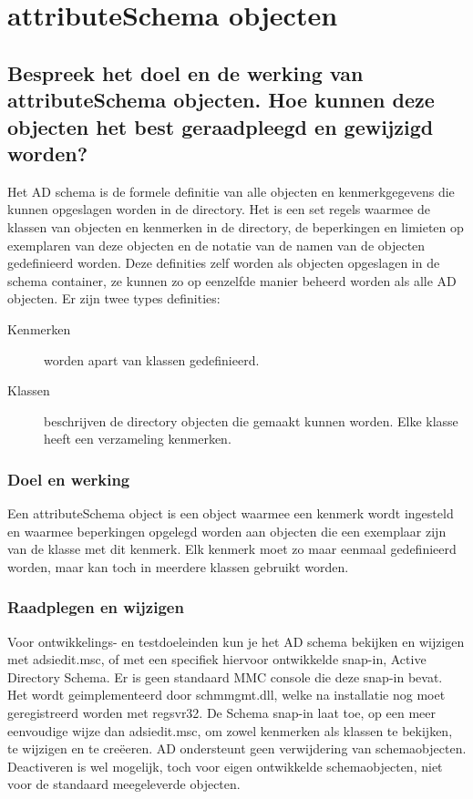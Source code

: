 \chapter{attributeSchema objecten}

\section{Bespreek het doel en de werking van attributeSchema objecten. Hoe
kunnen deze objecten het best geraadpleegd en gewijzigd worden?}

Het AD schema is de formele definitie van alle objecten en kenmerkgegevens die
kunnen opgeslagen worden in de directory. Het is een set regels waarmee de
klassen van objecten en kenmerken in de directory, de beperkingen en limieten op
exemplaren van deze objecten en de notatie van de namen van de objecten
gedefinieerd worden. Deze definities zelf worden als objecten opgeslagen in de
schema container, ze kunnen zo op eenzelfde manier beheerd worden als alle AD
objecten. Er zijn twee types definities:
\begin{description}
	\item[Kenmerken] worden apart van klassen gedefinieerd.
	\item[Klassen] beschrijven de directory objecten die gemaakt kunnen
		worden. Elke klasse heeft een verzameling kenmerken.
\end{description}

\subsection{Doel en werking}

Een attributeSchema object is een object waarmee een kenmerk wordt ingesteld en
waarmee beperkingen opgelegd worden aan objecten die een exemplaar zijn van de
klasse met dit kenmerk. Elk kenmerk moet zo maar eenmaal gedefinieerd worden,
maar kan toch in meerdere klassen gebruikt worden.

\subsection{Raadplegen en wijzigen}

Voor ontwikkelings- en testdoeleinden kun je het AD schema bekijken en wijzigen
met adsiedit.msc, of met een specifiek hiervoor ontwikkelde snap-in, Active
Directory Schema. Er is geen standaard MMC console die deze snap-in bevat. Het
wordt geimplementeerd door schmmgmt.dll, welke na installatie nog moet
geregistreerd worden met regsvr32. De Schema snap-in laat toe, op een meer
eenvoudige wijze dan adsiedit.msc, om zowel kenmerken als klassen te bekijken,
te wijzigen en te creëeren. AD ondersteunt geen verwijdering van schemaobjecten.
Deactiveren is wel mogelijk, toch voor eigen ontwikkelde schemaobjecten, niet
voor de standaard meegeleverde objecten.

